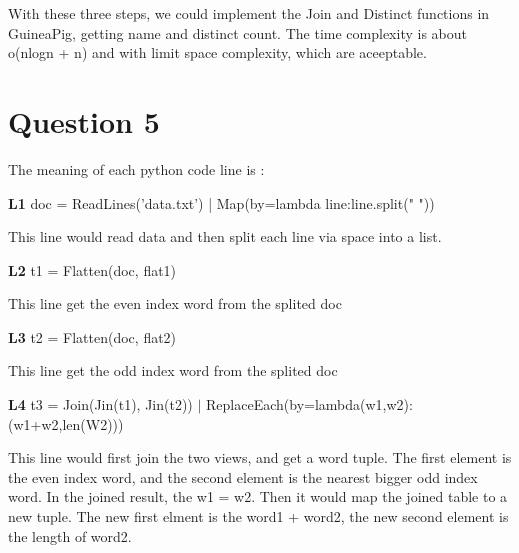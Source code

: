 \documentclass{article} %
\begin{document}
With these three steps, we could implement the Join and Distinct functions in
GuineaPig, getting name and distinct count. The time complexity is about
o(nlogn + n) and with limit space complexity, which are aceeptable.


\section{Question 5}
The meaning of each python code line is :


\textbf{L1} doc = ReadLines('data.txt') | Map(by=lambda line:line.split(" "))

\qquad This line would read data and then split each line via space into a list.

\textbf{L2} t1 = Flatten(doc, flat1)

\qquad This line get the even index word from the splited doc

\textbf{L3} t2 = Flatten(doc, flat2)

\qquad This line get the odd index word from the splited doc

\textbf{L4} t3 = Join(Jin(t1), Jin(t2)) $\mid$ ReplaceEach(by=lambda(w1,w2):(w1+w2,len(W2)))

\qquad This line would first join the two views, and get a word tuple. The first
element is the even index word, and the second element is the nearest bigger odd
index word. In the joined result, the w1 = w2. Then it would map the joined table
to a new tuple. The new first elment is the word1 + word2, the new second element
is the length of word2.
\end{document}
